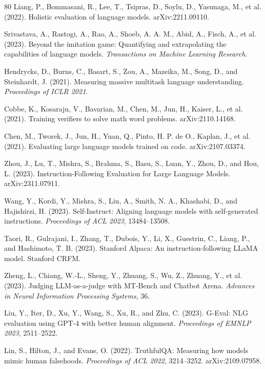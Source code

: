 \documentclass[11pt,a4paper]{article}
\begin{document}
\begin{thebibliography}{80}
Liang, P., Bommasani, R., Lee, T., Tsipras, D., Soylu, D., Yasunaga, M., et al. (2022). Holistic evaluation of language models. arXiv:2211.09110.

Srivastava, A., Rastogi, A., Rao, A., Shoeb, A. A. M., Abid, A., Fisch, A., et al. (2023). Beyond the imitation game: Quantifying and extrapolating the capabilities of language models. \textit{Transactions on Machine Learning Research}.

Hendrycks, D., Burns, C., Basart, S., Zou, A., Mazeika, M., Song, D., and Steinhardt, J. (2021). Measuring massive multitask language understanding. \textit{Proceedings of ICLR 2021}.

Cobbe, K., Kosaraju, V., Bavarian, M., Chen, M., Jun, H., Kaiser, L., et al. (2021). Training verifiers to solve math word problems. arXiv:2110.14168.

Chen, M., Tworek, J., Jun, H., Yuan, Q., Pinto, H. P. de O., Kaplan, J., et al. (2021). Evaluating large language models trained on code. arXiv:2107.03374.

Zhou, J., Lu, T., Mishra, S., Brahma, S., Basu, S., Luan, Y., Zhou, D., and Hou, L. (2023). Instruction-Following Evaluation for Large Language Models. arXiv:2311.07911.

Wang, Y., Kordi, Y., Mishra, S., Liu, A., Smith, N. A., Khashabi, D., and Hajishirzi, H. (2023). Self-Instruct: Aligning language models with self-generated instructions. \textit{Proceedings of ACL 2023}, 13484--13508.

Taori, R., Gulrajani, I., Zhang, T., Dubois, Y., Li, X., Guestrin, C., Liang, P., and Hashimoto, T. B. (2023). Stanford Alpaca: An instruction-following LLaMA model. Stanford CRFM.

Zheng, L., Chiang, W.-L., Sheng, Y., Zhuang, S., Wu, Z., Zhuang, Y., et al. (2023). Judging LLM-as-a-judge with MT-Bench and Chatbot Arena. \textit{Advances in Neural Information Processing Systems}, 36.

Liu, Y., Iter, D., Xu, Y., Wang, S., Xu, R., and Zhu, C. (2023). G-Eval: NLG evaluation using GPT-4 with better human alignment. \textit{Proceedings of EMNLP 2023}, 2511--2522.

Lin, S., Hilton, J., and Evans, O. (2022). TruthfulQA: Measuring how models mimic human falsehoods. \textit{Proceedings of ACL 2022}, 3214--3252. arXiv:2109.07958.


\end{thebibliography}
\end{document}
